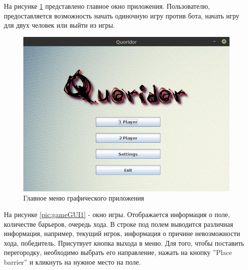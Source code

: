 \documentclass[a4paper]{article}
\begin{document}
На рисунке \ref{pic:mainGUI} представлено главное окно приложения. Пользователю, предоставляется возможность начать одиночную игру против бота, начать игру для двух человек или выйти из игры. 

\begin{figure}[H]
	\begin{center}
		\includegraphics[scale=0.5]{mainGUI}
		\caption{Главное меню графического приложения} 
		\label{pic:mainGUI} %
	\end{center}
\end{figure}

На рисунке \ref{pic:gameGUI1} - окно игры. Отображается информация о поле, количестве барьеров, очередь хода. В строке под полем выводится различная информация, например, текущий игрок, информация о причине невозможности хода, победитель. Присутвует кнопка выхода в меню. Для того, чтобы поставить перегородку, необходимо выбрать его направление, нажать на кнопку ''Place barrier'' и кликнуть на нужное место на поле.
\end{document}
